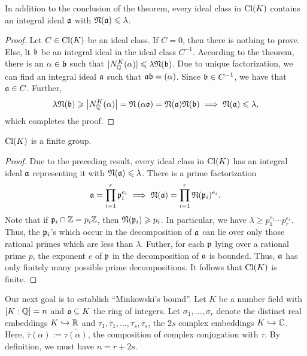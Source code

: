 \begin{corollary}
    In addition to the conclusion of the theorem, every ideal class in $\operatorname{Cl}(K)$ contains an integral ideal $\mathfrak{a}$ with $\mathfrak{N}(\mathfrak{a})\leqslant\lambda$.
\end{corollary}
\begin{proof}
    Let $C\in\operatorname{Cl}(K)$ be an ideal class. If $C = 0$, then there is nothing to prove. Else, lt $\mathfrak{b}$ be an integral ideal in the ideal class $C^{-1}$. According to the theorem, there is an $\alpha\in\mathfrak{b}$ such that $|N^K_{\mathbb{Q}}(\alpha)|\leqslant \lambda\mathfrak{N}(\mathfrak{b})$. Due to unique factorization, we can find an integral ideal $\mathfrak{a}$ such that $\mathfrak{a}\mathfrak{b} = (\alpha)$. Since $\mathfrak{b}\in C^{-1}$, we have that $\mathfrak{a}\in C$. Further,
    \begin{equation*}
        \lambda\mathfrak{N}(\mathfrak{b})\geqslant\left|N^K_{\mathbb{Q}}(\alpha)\right| = \mathfrak{N}\left(\alpha\mathfrak{o}\right) = \mathfrak{N}(\mathfrak{a})\mathfrak{N}(\mathfrak{b})\implies\mathfrak{N}(\mathfrak{a})\leqslant\lambda,
    \end{equation*}
    which completes the proof.
\end{proof}

\begin{corollary}
    $\operatorname{Cl}(K)$ is a finite group.
\end{corollary}
\begin{proof}
    Due to the preceding result, every ideal class in $\operatorname{Cl}(K)$ has an integral ideal $\mathfrak{a}$ representing it with $\mathfrak{N}(\mathfrak{a})\leqslant\lambda$. There is a prime factorization 
    \begin{equation*}
        \mathfrak{a} = \prod_{i = 1}^r \mathfrak{p}_i^{e_i}\implies\mathfrak{N}(\mathfrak{a}) = \prod_{i = 1}^r \mathfrak{N}(\mathfrak{p}_i)^{e_i}.
    \end{equation*}
    Note that if $\mathfrak{p}_i\cap\mathbb{Z} = p_i\mathbb{Z}$, then $\mathfrak{N}(\mathfrak{p}_i)\geqslant p_i$. In particular, we have $\lambda\ge p_1^{e_1}\cdots p_r^{e_r}$. Thus, the $\mathfrak{p}_i$'s which occur in the decomposition of $\mathfrak{a}$ can lie over only those rational primes which are less than $\lambda$. Futher, for each $\mathfrak{p}$ lying over a rational prime $p$, the exponent $e$ of  $\mathfrak{p}$ in the decomposition of $\mathfrak{a}$ is bounded. Thus, $\mathfrak{a}$ has only finitely many possible prime decompositions. It follows that $\operatorname{Cl}(K)$ is finite.
\end{proof}


Our next goal is to establish ``Minkowski's bound''. Let $K$ be a number field with $[K : \mathbb{Q}] = n$ and $\mathfrak{o}\subseteq K$ the ring of integers. Let $\sigma_1,\dots,\sigma_r$ denote the distinct real embeddings $K\hookrightarrow\mathbb{R}$ and $\tau_1,\overline\tau_1,\dots,\tau_s,\overline\tau_s$, the $2s$ complex embeddings $K\hookrightarrow\mathbb{C}$. Here, $\overline\tau(\alpha) := \overline{\tau(\alpha)}$, the composition of complex conjugation with $\tau$. By definition, we must have $n = r + 2s$.

